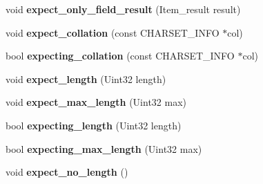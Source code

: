 \begin{DoxyCompactItemize}
void {\bfseries expect\+\_\+only\+\_\+field\+\_\+result} (Item\+\_\+result result)
\item 
\mbox{\label{classNdb__cond__traverse__context_ae6974096e068457ba0103976bff7ed4e}} 
void {\bfseries expect\+\_\+collation} (const C\+H\+A\+R\+S\+E\+T\+\_\+\+I\+N\+FO $\ast$col)
\item 
\mbox{\label{classNdb__cond__traverse__context_a84579315cc71a443a4473b3ff00177eb}} 
bool {\bfseries expecting\+\_\+collation} (const C\+H\+A\+R\+S\+E\+T\+\_\+\+I\+N\+FO $\ast$col)
\item 
\mbox{\label{classNdb__cond__traverse__context_a18cd8073e78304819818e51f17a79514}} 
void {\bfseries expect\+\_\+length} (Uint32 length)
\item 
\mbox{\label{classNdb__cond__traverse__context_a4346791c6967ce21fe766ea681ab9781}} 
void {\bfseries expect\+\_\+max\+\_\+length} (Uint32 max)
\item 
\mbox{\label{classNdb__cond__traverse__context_ab5d92df718377eaa6eb43890bb30fe7a}} 
bool {\bfseries expecting\+\_\+length} (Uint32 length)
\item 
\mbox{\label{classNdb__cond__traverse__context_a54962fa6e181d0f4007358c479b14c87}} 
bool {\bfseries expecting\+\_\+max\+\_\+length} (Uint32 max)
\item 
\mbox{\label{classNdb__cond__traverse__context_aa21e9134051e6c3576ac5278d9517450}} 
void {\bfseries expect\+\_\+no\+\_\+length} ()
\end{DoxyCompactItemize}
